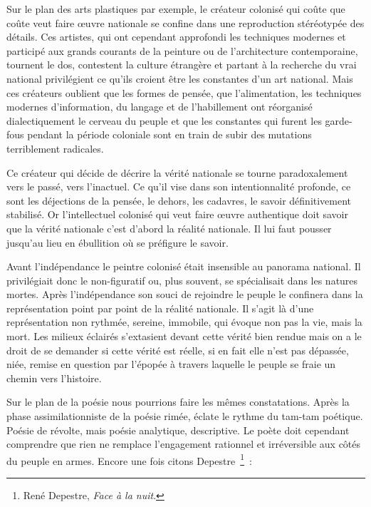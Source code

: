 \documentclass[french,twoside]{book} %
\begin{document}
\bigbreak
\noindent Sur le plan des arts plastiques par exemple, le créateur colonisé qui coûte que coûte veut faire œuvre nationale se confine dans une reproduction stéréotypée des détails. Ces artistes, qui ont cependant approfondi les techniques modernes et participé aux grands courants de la peinture ou de l’architecture contemporaine, tournent le dos, contestent la culture étrangère et partant à la recherche du vrai national privilégient ce qu’ils croient être les constantes d’un art national. Mais ces créateurs oublient que les formes de pensée, que l’alimentation, les techniques modernes d’information, du langage et de l’habillement ont réorganisé dialectiquement le cerveau du peuple et que les constantes qui furent les garde-fous pendant la période coloniale sont en train de subir des mutations terriblement radicales.\par
Ce créateur qui décide de décrire la vérité nationale se tourne paradoxalement vers le passé, vers l’inactuel. Ce qu’il vise dans son intentionnalité profonde, ce sont les déjections de la pensée, le dehors, les cadavres, le savoir définitivement stabilisé. Or l’intellectuel colonisé qui veut faire œuvre authentique doit savoir que la vérité nationale c’est d’abord la réalité nationale. Il lui faut pousser jusqu’au lieu en ébullition où se préfigure le savoir.\par
 Avant l’indépendance le peintre colonisé était insensible au panorama national. Il privilégiait donc le non-figuratif ou, plus souvent, se spécialisait dans les natures mortes. Après l’indépendance son souci de rejoindre le peuple le confinera dans la représentation point par point de la réalité nationale. Il s’agit là d’une représentation non rythmée, sereine, immobile, qui évoque non pas la vie, mais la mort. Les milieux éclairés s’extasient devant cette vérité bien rendue mais on a le droit de se demander si cette vérité est réelle, si en fait elle n’est pas dépassée, niée, remise en question par l’épopée à travers laquelle le peuple se fraie un chemin vers l’histoire.\par
\bigbreak
\noindent Sur le plan de la poésie nous pourrions faire les mêmes constatations. Après la phase assimilationniste de la poésie rimée, éclate le rythme du tam-tam poétique. Poésie de révolte, mais poésie analytique, descriptive. Le poète doit cependant comprendre que rien ne remplace l’engagement rationnel et irréversible aux côtés du peuple en armes. Encore une fois citons Depestre \footnote{René Depestre, \emph{Face à la nuit}.} :\par
\end{document}
